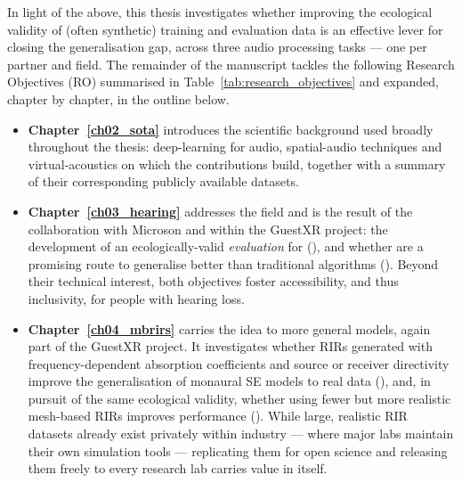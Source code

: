 In light of the above, this thesis investigates whether improving the
ecological validity of (often synthetic) training and evaluation data is an
effective lever for closing the generalisation gap, across three audio
processing tasks --- one per partner and field. The remainder of the manuscript tackles the following Research Objectives (RO) summarised in
Table~\ref{tab:research_objectives} and expanded, chapter by chapter, in the
outline below.

\begin{itemize}
    \item \textbf{Chapter~\ref{ch02_sota}} introduces the scientific background used broadly throughout the thesis: deep-learning for audio, spatial-audio techniques and virtual-acoustics on which the contributions build, together with a summary of their corresponding publicly available datasets.
    
    \item \textbf{Chapter~\ref{ch03_hearing}} addresses the  field and is the result of the collaboration with Microson and within the GuestXR project: the development of an ecologically-valid \emph{evaluation} for  (), and whether  are a promising route to generalise better than traditional  algorithms (). Beyond their technical interest, both objectives foster accessibility, and thus inclusivity, for people with hearing loss.

    \item \textbf{Chapter~\ref{ch04_mbrirs}} carries the idea to more general models, again part of the GuestXR project. It investigates whether \acrfull{RIR}s generated with frequency-dependent absorption coefficients and source or receiver directivity improve the generalisation of monaural \acrfull{SE} models to real data (), and, in pursuit of the same ecological validity, whether using fewer but more realistic mesh-based \acrshort{RIR}s improves performance (). While large, realistic \acrshort{RIR} datasets already exist privately within industry --- where major labs maintain their own simulation tools --- replicating them for open science and releasing them freely to every research lab carries value in itself.


\end{itemize}
